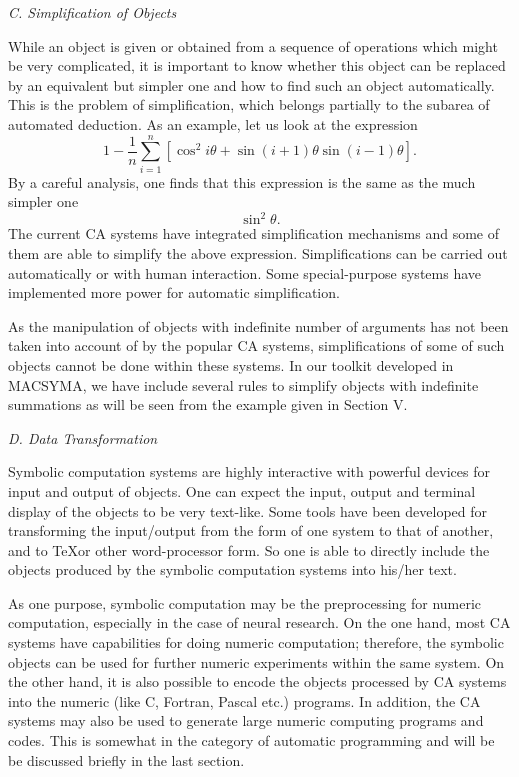 \bigskip
\noindent
{\em C. Simplification of Objects}

\smallskip
While an object is given or obtained from a sequence of operations which 
might be very complicated, it is important to know whether this object
can be replaced by an equivalent but simpler one and how to find such
an object automatically. This is the problem of simplification, which 
belongs partially to the subarea of automated deduction. As an example,
let us look at the expression
\[1-\frac{1}{n}\sum_{i=1}^n[\cos^2i\theta+\sin(i+1)\theta
\sin(i-1)\theta].\]
By a careful analysis, one finds that this expression is the
same as the much simpler one
\[\sin^2\theta.\]
The current CA systems have integrated simplification mechanisms and 
some of them are able to simplify the above expression.
Simplifications can be carried out automatically or with human
interaction. 
Some special-purpose systems have implemented more power for automatic 
simplification. 

As the manipulation of objects with indefinite number of arguments has
not 
been taken into account of by the popular CA systems, 
simplifications of some of such objects cannot be done within these
systems.
In our toolkit developed in MACSYMA, we have include several rules to 
simplify objects with indefinite summations as will be seen from the 
example given in Section V.


\bigskip
\noindent
{\em D. Data Transformation}

\smallskip
Symbolic computation systems are highly interactive with powerful
devices for input and output of objects. One can expect the input,
output and terminal display of the objects to be very text-like. Some
tools have been developed for transforming the input/output from
the form of one system to that of another, and to \TeX or other
word-processor form. So one is able to directly include the 
objects produced by the symbolic computation systems into his/her
text.

As one purpose, symbolic computation may be the preprocessing for
numeric computation, especially in the case of neural research. On the
one hand, most CA systems have capabilities for doing
numeric computation; therefore, the symbolic objects can be used for
further numeric experiments within the same system. 
On the other hand, it is also possible to
encode the objects processed by CA systems into the
numeric (like C, Fortran, Pascal etc.) programs. In addition, 
the CA systems may also be used to generate large numeric 
computing programs and codes. This is somewhat in the category
of automatic programming and will be be discussed briefly in the last 
section. 

